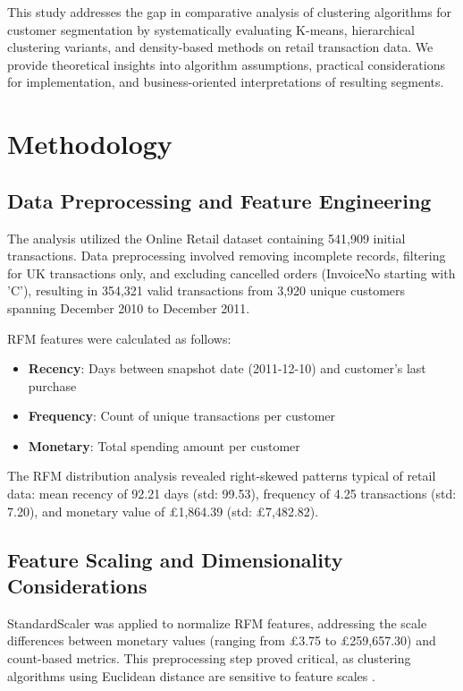 \documentclass[conference]{IEEEtran}
\begin{document}
This study addresses the gap in comparative analysis of clustering algorithms for customer segmentation by systematically evaluating K-means, hierarchical clustering variants, and density-based methods on retail transaction data. We provide theoretical insights into algorithm assumptions, practical considerations for implementation, and business-oriented interpretations of resulting segments.

\section{Methodology}

\subsection{Data Preprocessing and Feature Engineering}

The analysis utilized the Online Retail dataset containing 541,909 initial transactions. Data preprocessing involved removing incomplete records, filtering for UK transactions only, and excluding cancelled orders (InvoiceNo starting with 'C'), resulting in 354,321 valid transactions from 3,920 unique customers spanning December 2010 to December 2011.

RFM features were calculated as follows:
\begin{itemize}
\item \textbf{Recency}: Days between snapshot date (2011-12-10) and customer's last purchase
\item \textbf{Frequency}: Count of unique transactions per customer
\item \textbf{Monetary}: Total spending amount per customer
\end{itemize}

The RFM distribution analysis revealed right-skewed patterns typical of retail data: mean recency of 92.21 days (std: 99.53), frequency of 4.25 transactions (std: 7.20), and monetary value of £1,864.39 (std: £7,482.82).

\subsection{Feature Scaling and Dimensionality Considerations}

StandardScaler was applied to normalize RFM features, addressing the scale differences between monetary values (ranging from £3.75 to £259,657.30) and count-based metrics. This preprocessing step proved critical, as clustering algorithms using Euclidean distance are sensitive to feature scales \cite{b3}.
\end{document}
